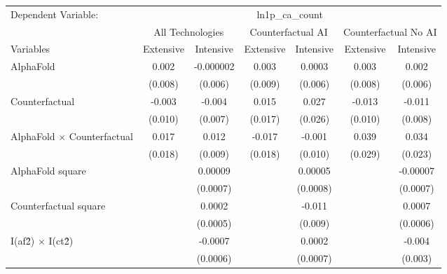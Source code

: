 \begingroup
\centering
\begin{tabular}{lcccccc}
   \tabularnewline \midrule \midrule
   Dependent Variable: & \multicolumn{6}{c}{ln1p\_ca\_count}\\
 & \multicolumn{2}{c}{All Technologies} & \multicolumn{2}{c}{Counterfactual AI} & \multicolumn{2}{c}{Counterfactual No AI} \\
\cmidrule(lr){1-1}\cmidrule(lr){2-3} \cmidrule(lr){4-5} \cmidrule(lr){6-7}
Variables & \multicolumn{1}{c}{Extensive} & \multicolumn{1}{c}{Intensive} & \multicolumn{1}{c}{Extensive} & \multicolumn{1}{c}{Intensive} & \multicolumn{1}{c}{Extensive} & \multicolumn{1}{c}{Intensive} \\
\cmidrule(lr){1-1}\cmidrule(lr){2-2} \cmidrule(lr){3-3} \cmidrule(lr){4-4} \cmidrule(lr){5-5} \cmidrule(lr){6-6} \cmidrule(lr){7-7}
   AlphaFold                          & 0.002   & -0.000002 & 0.003   & 0.0003   & 0.003   & 0.002\\   
                                      & (0.008) & (0.006)   & (0.009) & (0.006)  & (0.008) & (0.006)\\   
   Counterfactual                     & -0.003  & -0.004    & 0.015   & 0.027    & -0.013  & -0.011\\   
                                      & (0.010) & (0.007)   & (0.017) & (0.026)  & (0.010) & (0.008)\\   
   AlphaFold $\times$ Counterfactual  & 0.017   & 0.012     & -0.017  & -0.001   & 0.039   & 0.034\\   
                                      & (0.018) & (0.009)   & (0.018) & (0.010)  & (0.029) & (0.023)\\   
   AlphaFold square                   &         & 0.00009   &         & 0.00005  &         & -0.00007\\   
                                      &         & (0.0007)  &         & (0.0008) &         & (0.0007)\\   
   Counterfactual square              &         & 0.0002    &         & -0.011   &         & 0.0007\\   
                                      &         & (0.0005)  &         & (0.009)  &         & (0.0006)\\   
   I(af\^2) $\times$ I(ct\^2)         &         & -0.0007   &         & 0.0002   &         & -0.004\\   
                                      &         & (0.0006)  &         & (0.0007) &         & (0.003)\\   
   \midrule

\end{tabular}
